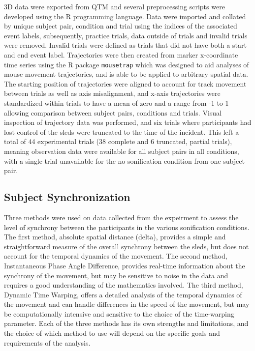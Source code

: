 \documentclass[10pt,a4paper,onecolumn]{article}
\begin{document}
3D data were exported from QTM and several preprocessing scripts were developed using the R programming language. Data were imported and collated by unique subject pair, condition and trial using the indices of the associated event labels, subsequently, practice trials, data outside of trials and invalid trials were removed. Invalid trials were defined as trials that did not have both a start and end event label. Trajectories were then created from marker x-coordinate time series using the R package \texttt{mousetrap} \autocite{mousetrap2021} which was designed to aid analyses of mouse movement trajectories, and is able to be applied to arbitrary spatial data. The starting position of trajectories were aligned to account for track movement between trials as well as axis misalignment, and x-axis trajectories were standardized within trials to have a mean of zero and a range from -1 to 1 allowing comparison between subject pairs, conditions and trials. Visual inspection of trajectory data was performed, and six trials where participants had lost control of the sleds were truncated to the time of the incident. This left a total of 44 experimental trials (38 complete and 6 truncated, partial trials), meaning observation data were available for all subject pairs in all conditions, with a single trial unavailable for the no sonification condition from one subject pair.

\hypertarget{subject-synchronization}{%
\subsection{Subject Synchronization}\label{subject-synchronization}}

Three methods were used on data collected from the expeirment to assess the level of synchrony between the participants in the various sonification conditions. The first method, absolute spatial distance (delta), provides a simple and straightforward measure of the overall synchrony between the sleds, but does not account for the temporal dynamics of the movement. The second method, Instantaneous Phase Angle Difference, provides real-time information about the synchrony of the movement, but may be sensitive to noise in the data and requires a good understanding of the mathematics involved. The third method, Dynamic Time Warping, offers a detailed analysis of the temporal dynamics of the movement and can handle differences in the speed of the movement, but may be computationally intensive and sensitive to the choice of the time-warping parameter. Each of the three methods has its own strengths and limitations, and the choice of which method to use will depend on the specific goals and requirements of the analysis.
\end{document}

